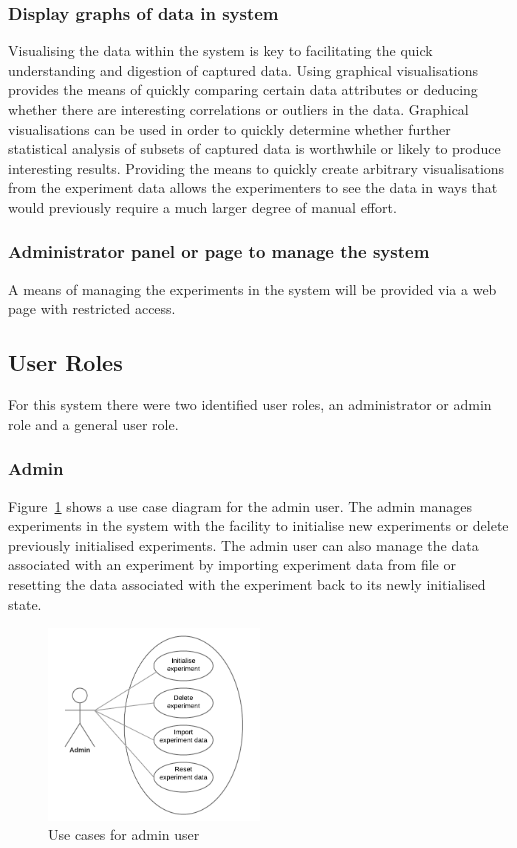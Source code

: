 \subsubsection{Display graphs of data in system}  Visualising the data within the system is key to facilitating the quick understanding and digestion of captured data. Using graphical visualisations provides the means of quickly comparing certain data attributes or deducing whether there are interesting correlations or outliers in the data. Graphical visualisations can be used in order to quickly determine whether further statistical analysis of subsets of captured data is worthwhile or likely to produce interesting results. Providing the means to quickly create arbitrary visualisations from the experiment data allows the experimenters to see the data in ways that would previously require a much larger degree of manual effort.

\subsubsection{Administrator panel or page to manage the system}  A means of managing the experiments in the system will be provided via a web page with restricted access.








\subsection{User Roles}
For this system there were two identified user roles, an administrator or admin role and a general user role.

\subsubsection{Admin}

Figure~\ref{fig:admin_case} shows a use case diagram for the admin user. The admin manages experiments in the system with the facility to initialise new experiments or delete previously initialised experiments. The admin user can also manage the data associated with an experiment by importing experiment data from file or resetting the data associated with the experiment back to its newly initialised state.

\begin{figure}[H]
    \centering
    \includegraphics[width=0.5\textwidth]{images/analysis/admin_case}
    \caption{Use cases for admin user}
    \label{fig:admin_case}
\end{figure}

